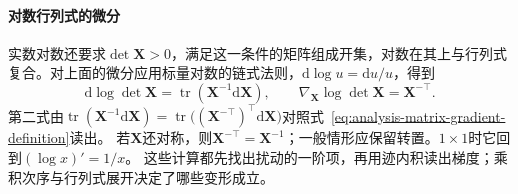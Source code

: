 \paragraph{对数行列式的微分}
实数对数还要求$\det\bm X>0$，满足这一条件的矩阵组成开集，对数在其上与行列式复合。对上面的微分应用标量对数的链式法则，$\mathrm d\log u=\mathrm du/u$，得到
\begin{equation}
  \mathrm{d}\log\det\bm{X}
  =
  \operatorname{tr}(\bm{X}^{-1}\mathrm{d}\bm{X}),
  \qquad
  \nabla_{\bm{X}}\log\det\bm{X}
  =
  \bm{X}^{-\top}.
\label{eq:analysis-logdet-gradient}
\end{equation}
第二式由$\operatorname{tr}(\bm X^{-1}\mathrm d\bm X)=\operatorname{tr}\bigl((\bm X^{-\top})^\top\mathrm d\bm X\bigr)$对照式~\eqref{eq:analysis-matrix-gradient-definition}读出。
若$\bm X$还对称，则$\bm{X}^{-\top}=\bm{X}^{-1}$；一般情形应保留转置。$1\times1$时它回到$(\log x)'=1/x$。
这些计算都先找出扰动的一阶项，再用迹内积读出梯度；乘积次序与行列式展开决定了哪些变形成立。

